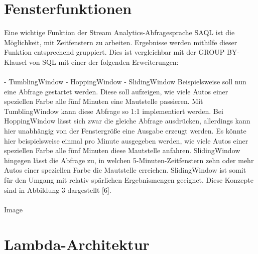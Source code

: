 \section{Fensterfunktionen}
Eine wichtige Funktion der Stream Analytics-Abfragesprache SAQL ist die Möglichkeit, mit Zeitfenstern zu arbeiten. Ergebnisse werden mithilfe dieser Funktion entsprechend gruppiert. Dies ist vergleichbar mit der GROUP BY-Klausel von SQL mit einer der folgenden Erweiterungen:\\ \\
-	TumblingWindow
-	HoppingWindow
-	SlidingWindow
Beispielsweise soll nun eine Abfrage gestartet werden. Diese soll aufzeigen, wie viele Autos einer speziellen Farbe alle fünf Minuten eine Mautstelle passieren. Mit TumblingWindow kann diese Abfrage so 1:1 implementiert werden. Bei HoppingWindow lässt sich zwar die gleiche Abfrage ausdrücken, allerdings kann hier unabhängig von der Fenstergröße eine Ausgabe erzeugt werden. Es könnte hier beispielsweise einmal pro Minute ausgegeben werden, wie viele Autos einer speziellen Farbe alle fünf Minuten diese Mautstelle anfahren. SlidingWindow hingegen lässt die Abfrage zu, in welchen 5-Minuten-Zeitfenstern zehn oder mehr Autos einer speziellen Farbe die Mautstelle erreichen. SlidingWindow ist somit für den Umgang mit relativ spärlichen Ergebnismengen geeignet. Diese Konzepte sind in Abbildung 3 dargestellt [6].\\ \\
Image

\section{Lambda-Architektur}

